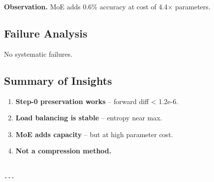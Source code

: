 \textbf{Observation.} MoE adds 0.6\% accuracy at cost of 
4.4$\times$ parameters.

\subsection{Failure Analysis}

No systematic failures.

\subsection{Summary of Insights}

\begin{enumerate}
\item \textbf{Step-0 preservation works} -- forward diff \textless{} 1.2e-6.
\item \textbf{Load balancing is stable} -- entropy near max.
\item \textbf{MoE adds capacity} -- but at high parameter cost.
\item \textbf{Not a compression method.}
\end{enumerate}
\begin{lstlisting}

---
\end{lstlisting}